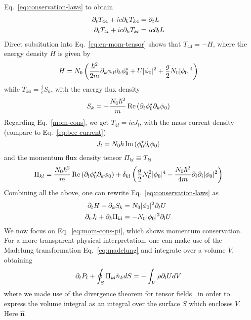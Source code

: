 \begin{subappendices}
Eq.~\eqref{eq:conservation-laws} to obtain
%
\begin{align}
  \partial_t T_{4 4} + i c \partial_{k} T_{k 4} & = \partial_t L\label{energy-cons}\\
  \partial_t T_{4 l} + i c \partial_{k} T_{k l} & = i c \partial_{l} L\label{mom-cons}
\end{align}
%
Direct subsitution into Eq.~\eqref{eq:en-mom-tensor} shows that
$T_{4 4} = -H$, where the energy density $H$ is given by
%
\begin{equation}\label{eq:en-density}
  H = N_0\left(
\frac{\hbar^2}{2m}\partial_k\phi_{0}\partial_k\phi_{0}^{\star} + U\vert \phi_{0} \vert^2 + \frac{g}{2}N_0\vert \phi_{0} \vert^4 \right)
\end{equation}
% 
while $T_{k 4} = \frac{i}{c}S_k$, with the energy flux density
%
\begin{equation}\label{eq:energy-source}
  S_k = -\frac{N_0\hbar^2}{m}\operatorname{Re}\left(\partial_t\phi_{0}^{\star}\partial_k\phi_{0}\right)
\end{equation}
% 
Regarding Eq.~\eqref{mom-cons}, we get $T_{4 l} = i c J_l$, with the mass
current density (compare to Eq.~\eqref{eq:bec-current})
\begin{equation}\label{eq:current}
  J_l = N_0\hbar\operatorname{Im}\left(\phi_{0}^{\star} \partial_l \phi_{0}\right)
\end{equation}
and the momentum flux density tensor $\Pi_{kl} \equiv T_{kl}$
%
\begin{equation}
  \Pi_{kl} = \frac{N_0\hbar^2}{m}\operatorname{Re}\left(\partial_l\phi_{0}^{\star}\partial_k\phi_{0}\right) + \delta_{kl}\left(\frac{g}{2}N_0^2\vert \phi_{0} \vert^4 -
    \frac{N_0\hbar^2}{4m}\partial_i\partial_i\vert \phi_{0} \vert^2\right)
\end{equation}
% 
Combining all the above, one can rewrite
Eq.~\eqref{eq:conservation-laws} as
%
\begin{align}
  \partial_t H + \partial_{k} S_k & = N_0\vert \phi_{0} \vert^2 \partial_{t} U\\
  \partial_t J_l  + \partial_{k} \Pi_{k l} & = -N_0\vert \phi_{0} \vert^2 \partial_{l} U\label{eq:mom-cons-pi}
\end{align}
%
We now focus on Eq.~\eqref{eq:mom-cons-pi}, which shows momentum
conservation. For a more transparent physical interpretation, one can
make use of the Madelung transformation Eq.~\eqref{eq:madelung} and
integrate over a volume $V$, obtaining
%
\begin{equation}\label{eq:gauss}
  \partial_t P_l  + \oint_S \Pi_{k l} \hat{n}_k d S  = -\int_{V}  \rho \partial_{l} U dV
\end{equation}
% 
where we made use of the divergence theorem for tensor
fields~\cite{the_brick} in order to express the volume integral as an
integral over the surface $S$ which encloses $V$. Here $\bm{\hat{n}}$

\end{subappendices}
